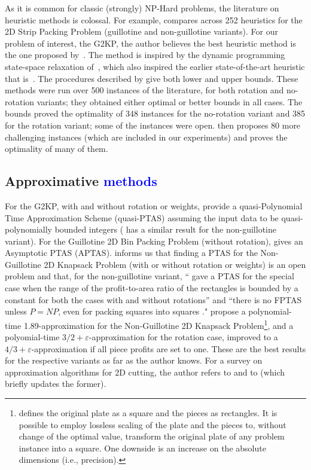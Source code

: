 \documentclass[ppgc,tese,english,formais,babel]{iiufrgs}
\newif\iffinalversion
\newcommand{\newtext}[1]{\iffinalversion%
#1%
\else%
\textcolor{blue}{#1}%
\fi%
}
\begin{document}
As it is common for classic (strongly) NP-Hard problems, the literature on heuristic methods is colossal.
For example, \citet{ortmann:2010} compares across 252 heuristics for the 2D Strip Packing Problem (guillotine and non-guillotine variants).
For our problem of interest, the G2KP, the author believes the best heuristic method is the one proposed by~\citet{velasco:2019}.
The method is inspired by the dynamic programming state-space relaxation of~\citet{nicos:1995:ssr}, which also inspired the earlier state-of-the-art heuristic that is~\citet{morabito:2010}.
The procedures described by \citet{velasco:2019} give both lower and upper bounds.
These methods were run over 500 instances of the literature, for both rotation and no-rotation variants; they obtained either optimal or better bounds in all cases.
The bounds proved the optimality of 348 instances for the no-rotation variant and 385 for the rotation variant; some of the instances were open.
\citet{velasco:2019} then proposes 80 more challenging instances (which are included in our experiments) and proves the optimality of many of them.

\subsection{Approximative \newtext{methods}}

For the G2KP, with and without rotation or weights, \citet{abed:2015} provide a quasi-Polynomial Time Approximation Scheme (quasi-PTAS) assuming the input data to be quasi-polynomially bounded integers (\citet{anna:2015:quasi} has a similar result for the non-guillotine variant).
For the Guillotine 2D Bin Packing Problem (without rotation), \citet{bansal:2005} gives an Asymptotic PTAS (APTAS).
\citet{christensen:2017} informs us that finding a PTAS for the Non-Guillotine 2D Knapsack Problem (with or without rotation or weights) is an open problem and that, for the non-guillotine variant, ``\citet{bansal:2009} gave a PTAS for the special case when the range of the profit-to-area ratio of the rectangles is bounded by a constant for both the cases with and without rotations'' and ``there is no FPTAS unless \(P = NP\), even for packing squares into squares \citep{leung:1990}."
\citet{galvez:2017} propose a polynomial-time 1.89-approximation for the Non-Guillotine 2D Knapsack Problem\footnote{\citet{galvez:2017} defines the original plate as a square and the pieces as rectangles. It is possible to employ lossless scaling of the plate and the pieces to, without change of the optimal value, transform the original plate of any problem instance into a square. One downside is an increase on the absolute dimensions (i.e., precision).}, and a polyomial-time \(3/2 + \varepsilon\)-approximation for the rotation case, improved to a \(4/3 + \varepsilon\)-approximation if all piece profits are set to one.
These are the best results for the respective variants as far as the author knows.
For a survey on approximation algorithms for 2D cutting, the author refers to \citet{christensen:2017} and to \citet{iori:2020} (which briefly updates the former).
\end{document}
